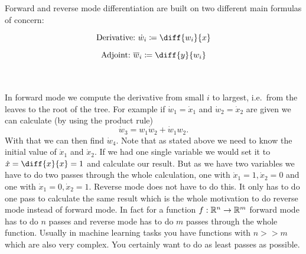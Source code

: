 \newcommand{\overw}[1]{\overline{w}_{#1}}
\newcommand{\diffyw}[1]{\diff{y}{w_{#1}}}
Forward and reverse mode differentiation are built on two different main formulas of concern:
\\
\begin{minipage}[c]{0.5\textwidth}
    \begin{equation*}
        \text{Derivative:}\ \dot w_i \coloneqq \diff{w_i}{x}
    \end{equation*}
\end{minipage}%
\begin{minipage}[c]{0.5\textwidth}
    \begin{equation*}
       \text{Adjoint:}\ \overw{i} \coloneqq \diffyw{i}
    \end{equation*}
\end{minipage}
\\ \\
In forward mode we compute the derivative from small $i$ to largest, i.e.\ from the leaves to the root of the tree. For example if $\dot w_1 = \dot x_1$ and $\dot w_2 = \dot x_2$ are given we can calculate (by using the product rule)
\[ \dot w_3 = w_1 \dot w_2 + \dot w_1 w_2. \]
With that we can then find $\dot w_4$. Note that as stated above we need to know the initial value of $\dot x_1$ and $\dot x_2$. If we had one single variable we would set it to $\dot x = \diff{x}{x} = 1$ and calculate our result. But as we have two variables we have to do two passes through the whole calculation, one with $\dot x_1 = 1, \dot x_2 = 0$ and one with $\dot x_1 = 0, \dot x_2 = 1$. Reverse mode does not have to do this. It only has to do one pass to calculate the same result which is the whole motivation to do reverse mode instead of forward mode. In fact for a function $f: \mathbb{R}^n \to \mathbb{R}^m$ forward mode has to do $n$ passes and reverse mode has to do $m$ passes through the whole function. Usually in machine learning tasks you have functions with $n >\! \!> m$ which are also very complex. You certainly want to do as least passes as possible.

